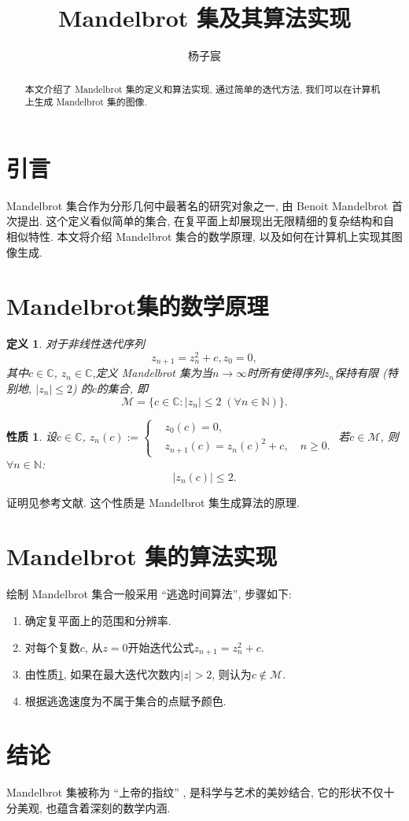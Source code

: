 \documentclass{article}
\title{Mandelbrot 集及其算法实现}
\author{杨子宸}
\newtheorem{definition}{定义}
\newtheorem{property}{性质}
\begin{document}
\maketitle

\begin{abstract}
本文介绍了 Mandelbrot 集的定义和算法实现, 通过简单的迭代方法, 我们可以在计算机上生成 Mandelbrot 集的图像.
\end{abstract}

\section{引言}
Mandelbrot 集合作为分形几何中最著名的研究对象之一, 由 Benoit Mandelbrot 首次提出\cite{mandelbrot1982fractal}. 这个定义看似简单的集合, 在复平面上却展现出无限精细的复杂结构和自相似特性. 本文将介绍 Mandelbrot 集合的数学原理, 以及如何在计算机上实现其图像生成.

\section{Mandelbrot集的数学原理}

\begin{definition}
对于非线性迭代序列
\[z_{n + 1} = z_n^2 + c, z_0 = 0,\]
其中\(c \in \mathbb{C}\), \(z_n \in \mathbb{C}\),定义 Mandelbrot 集为当\(n \to \infty\)时所有使得序列\(z_n\)保持有限 (特别地, \(|z_n| \leq 2\)) 的\(c\)的集合, 即
\[\mathcal{M} = \{c \in \mathbb{C}: |z_n| \leq 2\;(\forall n\in\mathbb{N})\}.\]
\end{definition}

\begin{property}
\label{prop::bounded}
设\(c \in \mathbb{C}\), \(z_n(c) := \left\{\begin{aligned}
&z_0(c) = 0,\\
&z_{n + 1}(c) = z_n(c)^2 + c, \quad n \geq 0.
\end{aligned}\right.\) 若\(c \in \mathcal{M}\), 则\(\forall n \in \mathbb{N}\):
\[|z_n(c)| \leq 2.\]
\end{property}

证明见参考文献\cite{branner1989mandelbrot}. 这个性质是 Mandelbrot 集生成算法的原理. 

\section{Mandelbrot 集的算法实现}
绘制 Mandelbrot 集合一般采用 ``逃逸时间算法'', 步骤如下:

\begin{enumerate}
\item 确定复平面上的范围和分辨率.
\item 对每个复数\(c\), 从\(z = 0\)开始迭代公式\(z_{n + 1} = z_n^2 + c\). 
\item 由性质\ref{prop::bounded}, 如果在最大迭代次数内\(|z| > 2\), 则认为\(c \notin \mathcal{M}\). 
\item 根据逃逸速度为不属于集合的点赋予颜色. 
\end{enumerate}

\section{结论}
Mandelbrot 集被称为 ``上帝的指纹'' , 是科学与艺术的美妙结合, 它的形状不仅十分美观, 也蕴含着深刻的数学内涵.



\end{document}
